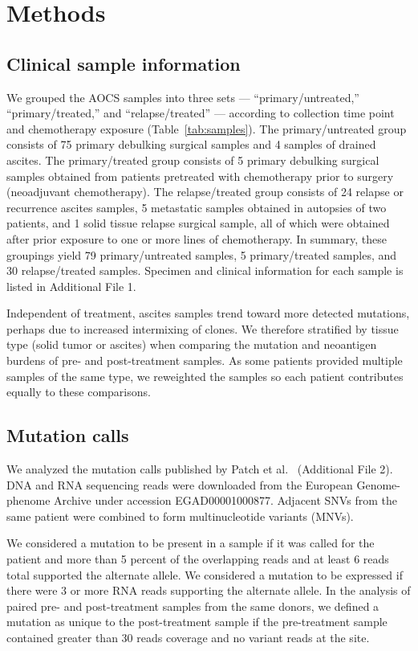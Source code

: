 \documentclass[linenumbers]{bmcart}
\begin{document}
\section*{Methods}
\subsection*{Clinical sample information}
We grouped the AOCS samples into three sets --- ``primary/untreated,'' ``primary/treated,'' and ``relapse/treated'' --- according to collection time point and chemotherapy exposure (Table~\ref{tab:samples}). The primary/untreated group consists of 75 primary debulking surgical samples and 4 samples of drained ascites. The primary/treated group consists of 5 primary debulking surgical samples obtained from patients pretreated with chemotherapy prior to surgery (neoadjuvant chemotherapy). The relapse/treated group consists of 24 relapse or recurrence ascites samples, 5 metastatic samples obtained in autopsies of two patients, and 1 solid tissue relapse surgical sample, all of which were obtained after prior exposure to one or more lines of chemotherapy.  In summary, these groupings yield 79 primary/untreated samples, 5 primary/treated samples, and 30 relapse/treated samples. Specimen and clinical information for each sample is listed in Additional File 1.

Independent of treatment, ascites samples trend toward more detected mutations, perhaps due to increased intermixing of clones. We therefore stratified by tissue type (solid tumor or ascites) when comparing the mutation and neoantigen burdens of pre- and post-treatment samples. As some patients provided multiple samples of the same type, we reweighted the samples so each patient contributes equally to these comparisons.

\subsection*{Mutation calls}
We analyzed the mutation calls published by Patch et al.~\cite{Patch_2015} (Additional File 2). DNA and RNA sequencing reads were downloaded from the European Genome-phenome Archive under accession EGAD00001000877. Adjacent SNVs from the same patient were combined to form multinucleotide variants (MNVs). 

We considered a mutation to be present in a sample if it was called for the patient and more than 5 percent of the overlapping reads and at least 6 reads total supported the alternate allele. We considered a mutation to be expressed if there were 3 or more RNA reads supporting the alternate allele. In the analysis of paired pre- and post-treatment samples from the same donors, we defined a mutation as unique to the post-treatment sample if the pre-treatment sample contained greater than 30 reads coverage and no variant reads at the site.
\end{document}
